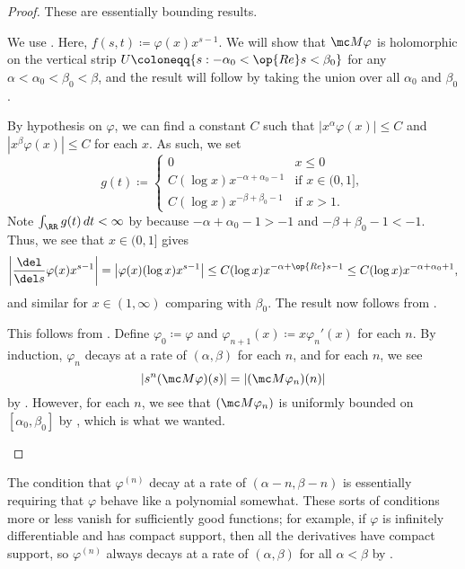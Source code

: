 \documentclass[../notes.tex]{subfiles}
\begin{document}
\begin{proof}
	These are essentially bounding results.
	\begin{listalph}
		\item We use . Here, $f(s,t)\coloneqq\varphi(x)x^{s-1}$. We will show that $\mc M\varphi$ is holomorphic on the vertical strip $U\coloneqq\{s:-\alpha_0<\op{Re}s<\beta_0\}$ for any $\alpha<\alpha_0<\beta_0<\beta$, and the result will follow by taking the union over all $\alpha_0$ and $\beta_0$.

		By hypothesis on $\varphi$, we can find a constant $C$ such that $\left|x^\alpha\varphi(x)\right|\le C$ and $\left|x^\beta\varphi(x)\right|\le C$ for each $x$. As such, we set
		\[g(t)\coloneqq\begin{cases}
			0 & x\le0 \\
			C(\log x)x^{-\alpha+\alpha_0-1} & \text{if }x\in(0,1], \\
			C(\log x)x^{-\beta+\beta_0-1} & \text{if }x>1.
		\end{cases}\]
		Note $\int_\RR g(t)\,dt<\infty$ by  because $-\alpha+\alpha_0-1>-1$ and $-\beta+\beta_0-1<-1$. Thus, we see that $x\in(0,1]$ gives
		\[\left|\frac{\del}{\del s}\varphi(x)x^{s-1}\right|=\left|\varphi(x)(\log x)x^{s-1}\right|\le C(\log x)x^{-\alpha+\op{Re}s-1}\le C(\log x)x^{-\alpha+\alpha_0+1},\]
		and similar for $x\in(1,\infty)$ comparing with $\beta_0$. The result now follows from .
		\item This follows from . Define $\varphi_0\coloneqq\varphi$ and $\varphi_{n+1}(x)\coloneqq x\varphi_n'(x)$ for each $n$. By induction, $\varphi_n$ decays at a rate of $(\alpha,\beta)$ for each $n$, and for each $n$, we see
		\[\left|s^n(\mc M\varphi)(s)\right|=\left|(\mc M\varphi_n)(n)\right|\]
		by . However, for each $n$, we see that $(\mc M\varphi_n)$ is uniformly bounded on $[\alpha_0,\beta_0]$ by , which is what we wanted.
		\qedhere
	\end{listalph}
\end{proof}
\begin{remark} \label{rem:compact-support-has-decaying-derivs}
	The condition that $\varphi^{(n)}$ decay at a rate of $(\alpha-n,\beta-n)$ is essentially requiring that $\varphi$ behave like a polynomial somewhat. These sorts of conditions more or less vanish for sufficiently good functions; for example, if $\varphi$ is infinitely differentiable and has compact support, then all the derivatives have compact support, so $\varphi^{(n)}$ always decays at a rate of $(\alpha,\beta)$ for all $\alpha<\beta$ by .
\end{remark}
\end{document}
